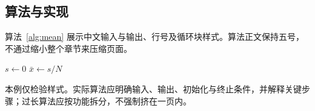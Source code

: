 \subsection{算法与实现}
算法~\ref{alg:mean} 展示中文输入与输出、行号及循环块样式。算法正文保持五号，不通过缩小整个章节来压缩页面。

\begin{algorithm}[htbp]
\caption{样本均值计算示例}\label{alg:mean}
$s\gets0$\;
$\bar x\gets s/N$\;
\end{algorithm}

本例仅检验样式。实际算法应明确输入、输出、初始化与终止条件，并解释关键步骤；过长算法应按功能拆分，不强制挤在一页内。
